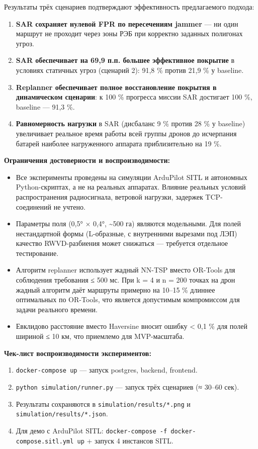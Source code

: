Результаты трёх сценариев подтверждают эффективность предлагаемого подхода:

\begin{enumerate}
\def\labelenumi{\arabic{enumi}.}
\item
  \textbf{SAR сохраняет нулевой FPR по пересечениям jammer} --- ни один маршрут не проходит через зоны РЭБ при корректно заданных полигонах угроз.
\item
  \textbf{SAR обеспечивает на 69,9 п.п. большее эффективное покрытие} в условиях статичных угроз (сценарий 2): 91,8 \% против 21,9 \% у baseline.
\item
  \textbf{Replanner обеспечивает полное восстановление покрытия в динамическом сценарии}: к 100 \% прогресса миссии SAR достигает 100 \%, baseline --- 91,3 \%.
\item
  \textbf{Равномерность нагрузки} в SAR (дисбаланс 9 \% против 28 \% у baseline) увеличивает реальное время работы всей группы дронов до исчерпания батарей наиболее нагруженного аппарата приблизительно на 19 \%.
\end{enumerate}

\textbf{Ограничения достоверности и воспроизводимости:}

\begin{itemize}
\tightlist
\item
  Все эксперименты проведены на симуляции ArduPilot SITL и автономных Python-скриптах, а не на реальных аппаратах. Влияние реальных условий распространения радиосигнала, ветровой нагрузки, задержек TCP-соединений не учтено.
\item
  Параметры поля (0,5° × 0,4°, \textasciitilde500 га) являются модельными. Для полей нестандартной формы (L-образные, с внутренними вырезами под ЛЭП) качество RWVD-разбиения может снижаться --- требуется отдельное тестирование.
\item
  Алгоритм replanner использует жадный NN-TSP вместо OR-Tools для соблюдения требования ≤ 500 мс. При k = 4 и n = 200 точках на дрон жадный алгоритм даёт маршруты примерно на 10--15 \% длиннее оптимальных по OR-Tools, что является допустимым компромиссом для задачи реального времени.
\item
  Евклидово расстояние вместо Haversine вносит ошибку \textless{} 0,1 \% для полей шириной ≤ 10 км, что приемлемо для MVP-масштаба.
\end{itemize}

\textbf{Чек-лист воспроизводимости экспериментов:}

\begin{enumerate}
\def\labelenumi{\arabic{enumi}.}
\tightlist
\item
  \texttt{docker-compose\ up} --- запуск postgres, backend, frontend.
\item
  \texttt{python\ simulation/runner.py} --- запуск трёх сценариев (≈ 30--60 сек).
\item
  Результаты сохраняются в \texttt{simulation/results/*.png} и \texttt{simulation/results/*.json}.
\item
  Для демо с ArduPilot SITL: \texttt{docker-compose\ -f\ docker-compose.sitl.yml\ up} + запуск 4 инстансов SITL.
\end{enumerate}

